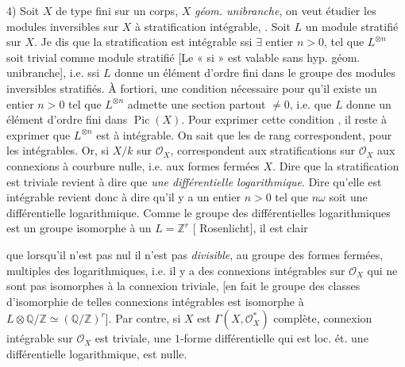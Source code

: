 \documentclass[11pt,a4paper]{article}
\begin{document}
4) Soit $X$ de type fini sur un corps, $X$ \struck{\ill{}} \emph{géom.
unibranche}, on veut étudier les modules inversibles sur $X$ à stratification
intégrable, \struck{\ill{}}. Soit $L$ un module  stratifié sur
$X$. Je dis que la stratification est intégrable ssi $\exists$ entier $n>0$,
 tel que $L^{\otimes n}$ soit trivial
comme module stratifié [Le « si » est valable sans hyp. géom. unibranche],
i.e. ssi  $L$ donne un élément d'ordre fini  dans le groupe des modules inversibles stratifiés. À fortiori, une
 condition nécessaire pour qu'il existe un entier $n>0$
 tel que $L^{\otimes n}$ admette une section partout $\neq
0$, i.e. que $L$ donne un élément d'ordre fini  dans
$\operatorname{Pic}(X)$. Pour exprimer cette condition \struck{\ill{}}
, il reste à exprimer que $L^{\otimes n}$ est à
  intégrable. On sait que les
 \struck{\ill{}} de rang  correspondent,
pour les   intégrables. Or, si $X/k$
\ill{} sur $\mathcal{O}_X$, \struck{\ill{}} 
correspondent aux stratifications sur $\mathcal{O}_X$  aux
connexions à courbure nulle, i.e. aux formes  fermées
 $X$. Dire que la stratification est triviale
 revient à dire que  \emph{une
différentielle logarithmique}. Dire qu'elle est intégrable revient donc à dire
qu'il y a un entier $n>0$ tel que $n\omega$ soit une différentielle
logarithmique. Comme le groupe des différentielles logarithmiques est un
groupe isomorphe à un $L=\mathbb{Z}^r$ [ Rosenlicht], il
est clair

que lorsqu'il n'est pas nul il n'est pas \emph{divisible}, \struck{\ill{}} au
groupe des formes fermées, multiples des logarithmiques, i.e. il y a des
\struck{\ill{}} connexions intégrables sur $\mathcal{O}_X$ qui ne sont pas
isomorphes à la connexion triviale, [en fait le groupe des classes
d'isomorphie de telles connexions intégrables est isomorphe à
$L\otimes\mathbb{Q}/\mathbb{Z}\simeq(\mathbb{Q}/\mathbb{Z})^r$]. Par contre,
si $X$ est  $\Gamma(X,\mathcal{O}_X^*)$ \struck{\ill{}}  complète, \struck{\ill{}}  connexion
intégrable sur $\mathcal{O}_X$ est triviale,  une $1$-forme
différentielle qui est loc. ét. une différentielle logarithmique, est nulle.
 
  \ill{}
\end{document}
